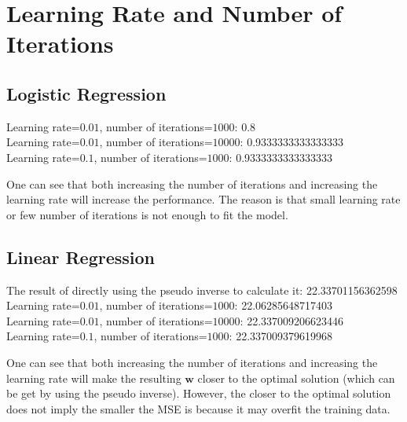 \section{Learning Rate and Number of Iterations}

\subsection{Logistic Regression}
\noindent
Learning rate=$0.01$, number of iterations=$1000$: 0.8\\
Learning rate=$0.01$, number of iterations=$10000$: 0.9333333333333333\\
Learning rate=$0.1$, number of iterations=$1000$: 0.9333333333333333

One can see that both increasing the number of iterations and increasing the learning rate will increase the performance. The reason is that small learning rate or few number of iterations is not enough to fit the model.

\subsection{Linear Regression}
\noindent
The result of directly using the pseudo inverse to calculate it: 22.33701156362598\\
Learning rate=$0.01$, number of iterations=$1000$: 22.06285648717403\\
Learning rate=$0.01$, number of iterations=$10000$: 22.337009206623446\\
Learning rate=$0.1$, number of iterations=$1000$: 22.337009379619968

One can see that both increasing the number of iterations and increasing the learning rate will make the resulting $\mathbf{w}$ closer to the optimal solution (which can be get by using the pseudo inverse). However, the closer to the optimal solution does not imply the smaller the MSE is because it may overfit the training data.
